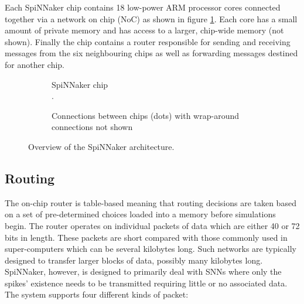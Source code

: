 			Each SpiNNaker chip contains 18 low-power ARM processor cores connected
			together via a network on chip (NoC) as shown in figure
			\ref{fig:spinnaker-chip}. Each core has a small amount of private memory
			and has access to a larger, chip-wide memory (not shown). Finally the chip
			contains a router responsible for sending and receiving messages from the
			six neighbouring chips as well as forwarding messages destined for another
			chip.
			
			
			\begin{figure}
				\center
				\begin{subfigure}[b]{0.49\textwidth}
					\center
					
					\caption{SpiNNaker chip\\\color{white}.}
					\label{fig:spinnaker-chip}
				\end{subfigure}
				\begin{subfigure}[b]{0.49\textwidth}
					\center
					
					\caption{Connections between chips (dots) with wrap-around
					connections not shown}
					\label{fig:spinnaker-chips}
				\end{subfigure}
				
				\caption{Overview of the SpiNNaker architecture.}
				\label{fig:spinnaker-architecture}
			\end{figure}
		
		\subsection{Routing}
			
			
			The on-chip router is table-based meaning that routing decisions are taken
			based on a set of pre-determined choices loaded into a memory before
			simulations begin. The router operates on individual packets of data which
			are either 40 or 72 bits in length. These packets are short compared
			with those commonly used in super-computers which can be several kilobytes
			long.  Such networks are typically designed to transfer larger blocks of
			data, possibly many kilobytes long. SpiNNaker, however, is designed to
			primarily deal with SNNs where only the spikes' existence needs to be
			transmitted requiring little or no associated data.  The system supports
			four different kinds of packet:
			
